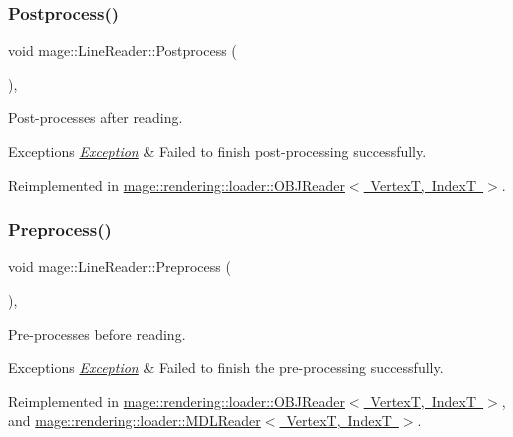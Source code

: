 \subsubsection{\texorpdfstring{Postprocess()}{Postprocess()}}
{\footnotesize\ttfamily void mage\+::\+Line\+Reader\+::\+Postprocess (\begin{DoxyParamCaption}{ }\end{DoxyParamCaption})\hspace{0.3cm}{\ttfamily [private]}, {\ttfamily [virtual]}}

Post-\/processes after reading.


\begin{DoxyExceptions}{Exceptions}
{\em \mbox{\hyperlink{classmage_1_1_exception}{Exception}}} & Failed to finish post-\/processing successfully. \\
\hline
\end{DoxyExceptions}


Reimplemented in \mbox{\hyperlink{classmage_1_1rendering_1_1loader_1_1_o_b_j_reader_a281c16ef7d20a7c1416923f3cadee33a}{mage\+::rendering\+::loader\+::\+O\+B\+J\+Reader$<$ Vertex\+T, Index\+T $>$}}.

\mbox{\label{classmage_1_1_line_reader_ad81a84bf9ecd81b9a391698afbd5eb61}} 
\subsubsection{\texorpdfstring{Preprocess()}{Preprocess()}}
{\footnotesize\ttfamily void mage\+::\+Line\+Reader\+::\+Preprocess (\begin{DoxyParamCaption}{ }\end{DoxyParamCaption})\hspace{0.3cm}{\ttfamily [private]}, {\ttfamily [virtual]}}

Pre-\/processes before reading.


\begin{DoxyExceptions}{Exceptions}
{\em \mbox{\hyperlink{classmage_1_1_exception}{Exception}}} & Failed to finish the pre-\/processing successfully. \\
\hline
\end{DoxyExceptions}


Reimplemented in \mbox{\hyperlink{classmage_1_1rendering_1_1loader_1_1_o_b_j_reader_ad082a6295259f7e8af2c60c182ea55d3}{mage\+::rendering\+::loader\+::\+O\+B\+J\+Reader$<$ Vertex\+T, Index\+T $>$}}, and \mbox{\hyperlink{classmage_1_1rendering_1_1loader_1_1_m_d_l_reader_a397f0c0eedc56c983fc3a7074aa4e577}{mage\+::rendering\+::loader\+::\+M\+D\+L\+Reader$<$ Vertex\+T, Index\+T $>$}}.

